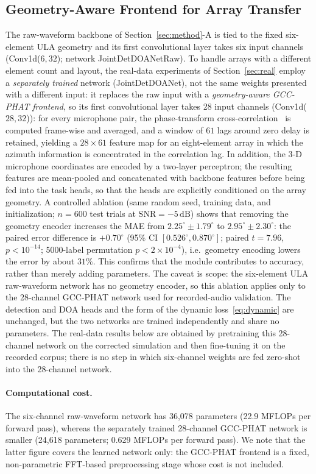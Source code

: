 \documentclass[5p,twocolumn]{elsarticle}
\begin{document}
\subsection{Geometry-Aware Frontend for Array Transfer}
\label{sec:geo}
The raw-waveform backbone of Section~\ref{sec:method}-A is tied to the fixed six-element ULA geometry and its first convolutional layer takes six input channels (Conv1d($6,32$); network JointDetDOANetRaw). To handle arrays with a different element count and layout, the real-data experiments of Section~\ref{sec:real} employ a \emph{separately trained} network (JointDetDOANet), not the same weights presented with a different input: it replaces the raw input with a \emph{geometry-aware GCC-PHAT frontend}, so its first convolutional layer takes 28 input channels (Conv1d($28,32$)): for every microphone pair, the phase-transform cross-correlation~\cite{knapp1976gcc} is computed frame-wise and averaged, and a window of $61$ lags around zero delay is retained, yielding a $28\times61$ feature map for an eight-element array in which the azimuth information is concentrated in the correlation lag. In addition, the 3-D microphone coordinates are encoded by a two-layer perceptron; the resulting features are mean-pooled and concatenated with backbone features before being fed into the task heads, so that the heads are explicitly conditioned on the array geometry. A controlled ablation (same random seed, training data, and initialization; $n=600$ test trials at $\mathrm{SNR}=-5\,\mathrm{dB}$) shows that removing the geometry encoder increases the MAE from $2.25^\circ\pm1.79^\circ$ to $2.95^\circ\pm2.30^\circ$: the paired error difference is $+0.70^\circ$ (95\% CI $[0.526^\circ,0.870^\circ]$; paired $t=7.96$, $p<10^{-14}$; 5000-label permutation $p<2\times10^{-4}$), i.e.\ geometry encoding lowers the error by about $31\%$. This confirms that the module contributes to accuracy, rather than merely adding parameters. The caveat is scope: the six-element ULA raw-waveform network has no geometry encoder, so this ablation applies only to the 28-channel GCC-PHAT network used for recorded-audio validation. The detection and DOA heads and the form of the dynamic loss~\eqref{eq:dynamic} are unchanged, but the two networks are trained independently and share no parameters. The real-data results below are obtained by pretraining this 28-channel network on the corrected simulation and then fine-tuning it on the recorded corpus; there is no step in which six-channel weights are fed zero-shot into the 28-channel network.
\paragraph{Computational cost.}
The six-channel raw-waveform network has 36,078 parameters (22.9 MFLOPs per forward pass), whereas the separately trained 28-channel GCC-PHAT network is smaller (24,618 parameters; 0.629 MFLOPs per forward pass). We note that the latter figure covers the learned network only: the GCC-PHAT frontend is a fixed, non-parametric FFT-based preprocessing stage whose cost is not included.
\end{document}

